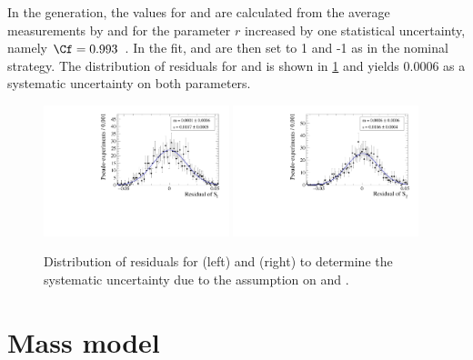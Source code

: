 In the generation, the values for \Cf and \Cfbar are calculated from the average measurements by \belle and \babar for the parameter $r$ increased by one statistical uncertainty, namely $\Cf=0.993$~\cite{Aubert:2008zi, Das:2010be}.
In the fit, \Cf and \Cfbar are then set to \num{1} and {-1} as in the nominal strategy.
The distribution of residuals for \Sf and \Sfbar is shown in \cref{fig:systUncertC} and yields \num{0.0006} as a systematic uncertainty on both parameters.
\begin{figure}[tbp]
    \centering
    \includegraphics[width=0.48\textwidth]{10Systematics/figs/C_Sf_res.pdf}
    \includegraphics[width=0.48\textwidth]{10Systematics/figs/C_Sfbar_res.pdf}
    \caption{Distribution of residuals for \Sf (left) and \Sfbar (right) to determine the systematic uncertainty due to the assumption on \Cf and \Cfbar.}
    \label{fig:systUncertC}
\end{figure}

\section{Mass model}
\label{sec:SystUncertMass}

